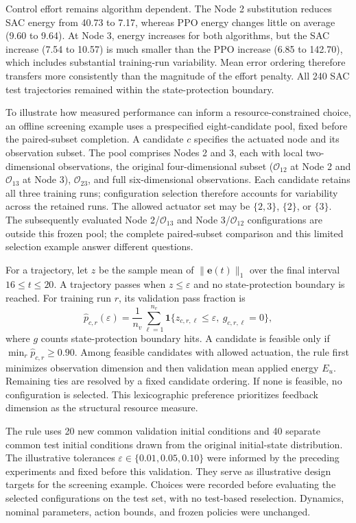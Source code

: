 \documentclass[a4paper,fleqn]{cas-sc}
\theoremstyle{plain}
\theoremstyle{definition}
\begin{document}
Control effort remains algorithm dependent. The Node 2 substitution reduces SAC energy from 40.73 to 7.17, whereas PPO energy changes little on average (9.60 to 9.64). At Node 3, energy increases for both algorithms, but the SAC increase (7.54 to 10.57) is much smaller than the PPO increase (6.85 to 142.70), which includes substantial training-run variability. Mean error ordering therefore transfers more consistently than the magnitude of the effort penalty. All 240 SAC test trajectories remained within the state-protection boundary.

To illustrate how measured performance can inform a resource-constrained choice, an offline screening example uses a prespecified eight-candidate pool, fixed before the paired-subset completion. A candidate $c$ specifies the actuated node and its observation subset. The pool comprises Nodes 2 and 3, each with local two-dimensional observations, the original four-dimensional subset ($\mathcal O_{12}$ at Node 2 and $\mathcal O_{13}$ at Node 3), $\mathcal O_{23}$, and full six-dimensional observations. Each candidate retains all three training runs; configuration selection therefore accounts for variability across the retained runs. The allowed actuator set may be $\{2,3\}$, $\{2\}$, or $\{3\}$. The subsequently evaluated Node 2/$\mathcal O_{13}$ and Node 3/$\mathcal O_{12}$ configurations are outside this frozen pool; the complete paired-subset comparison and this limited selection example answer different questions.

For a trajectory, let $z$ be the sample mean of $\|\mathbf e(t)\|_1$ over the final interval $16\leq t\leq20$. A trajectory passes when $z\leq\varepsilon$ and no state-protection boundary is reached. For training run $r$, its validation pass fraction is
\begin{equation}
 \widehat p_{c,r}(\varepsilon)
 =\frac{1}{n_v}\sum_{\ell=1}^{n_v}
 \mathbf 1\{z_{c,r,\ell}\leq\varepsilon,\ g_{c,r,\ell}=0\},
 \label{eq:configuration_pass}
\end{equation}
where $g$ counts state-protection boundary hits. A candidate is feasible only if $\min_r\widehat p_{c,r}\geq0.90$. Among feasible candidates with allowed actuation, the rule first minimizes observation dimension and then validation mean applied energy $E_u$. Remaining ties are resolved by a fixed candidate ordering. If none is feasible, no configuration is selected. This lexicographic preference prioritizes feedback dimension as the structural resource measure.

The rule uses 20 new common validation initial conditions and 40 separate common test initial conditions drawn from the original initial-state distribution. The illustrative tolerances $\varepsilon\in\{0.01,0.05,0.10\}$ were informed by the preceding experiments and fixed before this validation. They serve as illustrative design targets for the screening example. Choices were recorded before evaluating the selected configurations on the test set, with no test-based reselection. Dynamics, nominal parameters, action bounds, and frozen policies were unchanged.
\end{document}
